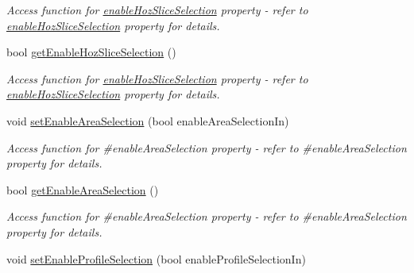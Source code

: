 \begin{DoxyCompactItemize}
\begin{DoxyCompactList}\small\item\em Access function for \hyperlink{classQEImage_adc8455250e7fb3f790001d8458971df9}{enableHozSliceSelection} property -\/ refer to \hyperlink{classQEImage_adc8455250e7fb3f790001d8458971df9}{enableHozSliceSelection} property for details. \end{DoxyCompactList}\item 
\hypertarget{classQEImage_aebfc960bb2fdb51ce3fda3b61b5cfd74}{
bool \hyperlink{classQEImage_aebfc960bb2fdb51ce3fda3b61b5cfd74}{getEnableHozSliceSelection} ()}
\label{classQEImage_aebfc960bb2fdb51ce3fda3b61b5cfd74}

\begin{DoxyCompactList}\small\item\em Access function for \hyperlink{classQEImage_adc8455250e7fb3f790001d8458971df9}{enableHozSliceSelection} property -\/ refer to \hyperlink{classQEImage_adc8455250e7fb3f790001d8458971df9}{enableHozSliceSelection} property for details. \end{DoxyCompactList}\item 
\hypertarget{classQEImage_a4aa364e3360a770486c3199b315539b1}{
void \hyperlink{classQEImage_a4aa364e3360a770486c3199b315539b1}{setEnableAreaSelection} (bool enableAreaSelectionIn)}
\label{classQEImage_a4aa364e3360a770486c3199b315539b1}

\begin{DoxyCompactList}\small\item\em Access function for \#enableAreaSelection property -\/ refer to \#enableAreaSelection property for details. \end{DoxyCompactList}\item 
\hypertarget{classQEImage_aea87702dc4de21f89cb7fbc4176ee776}{
bool \hyperlink{classQEImage_aea87702dc4de21f89cb7fbc4176ee776}{getEnableAreaSelection} ()}
\label{classQEImage_aea87702dc4de21f89cb7fbc4176ee776}

\begin{DoxyCompactList}\small\item\em Access function for \#enableAreaSelection property -\/ refer to \#enableAreaSelection property for details. \end{DoxyCompactList}\item 
\hypertarget{classQEImage_a88d6b38c2a6f6de0d066d35a91d00f67}{
void \hyperlink{classQEImage_a88d6b38c2a6f6de0d066d35a91d00f67}{setEnableProfileSelection} (bool enableProfileSelectionIn)}
\label{classQEImage_a88d6b38c2a6f6de0d066d35a91d00f67}


\end{DoxyCompactItemize}
